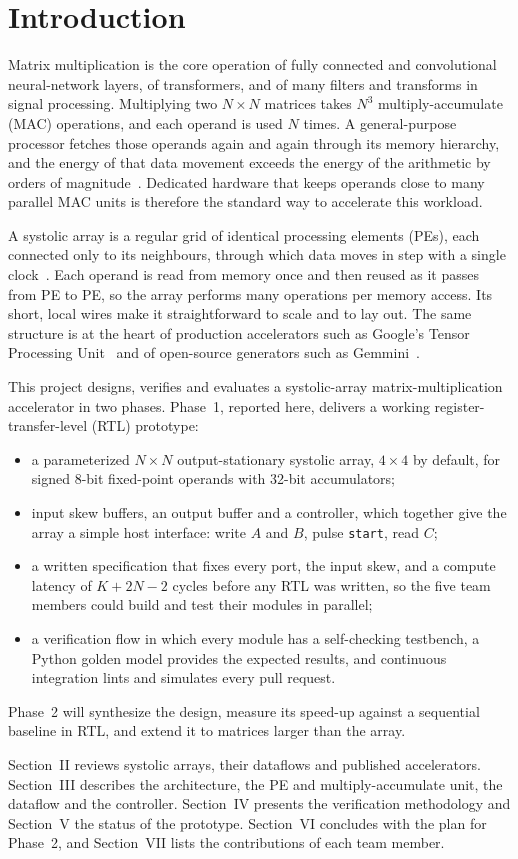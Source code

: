 
\section{Introduction}
Matrix multiplication is the core operation of fully connected and convolutional neural-network layers, of transformers, and of many filters and transforms in signal processing. Multiplying two $N \times N$ matrices takes $N^3$ multiply-accumulate (MAC) operations, and each operand is used $N$ times. A general-purpose processor fetches those operands again and again through its memory hierarchy, and the energy of that data movement exceeds the energy of the arithmetic by orders of magnitude~\cite{horowitz2014energy, sze2017efficient}. Dedicated hardware that keeps operands close to many parallel MAC units is therefore the standard way to accelerate this workload.

A systolic array is a regular grid of identical processing elements (PEs), each connected only to its neighbours, through which data moves in step with a single clock~\cite{kung1979systolic, kung1982systolic}. Each operand is read from memory once and then reused as it passes from PE to PE, so the array performs many operations per memory access. Its short, local wires make it straightforward to scale and to lay out. The same structure is at the heart of production accelerators such as Google's Tensor Processing Unit~\cite{jouppi2017tpu} and of open-source generators such as Gemmini~\cite{genc2021gemmini}.

This project designs, verifies and evaluates a systolic-array matrix-multiplication accelerator in two phases. Phase~1, reported here, delivers a working register-transfer-level (RTL) prototype:
\begin{itemize}
\item a parameterized $N \times N$ output-stationary systolic array, $4 \times 4$ by default, for signed 8-bit fixed-point operands with 32-bit accumulators;
\item input skew buffers, an output buffer and a controller, which together give the array a simple host interface: write $A$ and $B$, pulse \texttt{start}, read $C$;
\item a written specification that fixes every port, the input skew, and a compute latency of $K + 2N - 2$ cycles before any RTL was written, so the five team members could build and test their modules in parallel;
\item a verification flow in which every module has a self-checking testbench, a Python golden model provides the expected results, and continuous integration lints and simulates every pull request.
\end{itemize}
Phase~2 will synthesize the design, measure its speed-up against a sequential baseline in RTL, and extend it to matrices larger than the array.

Section~II reviews systolic arrays, their dataflows and published accelerators. Section~III describes the architecture, the PE and multiply-accumulate unit, the dataflow and the controller. Section~IV presents the verification methodology and Section~V the status of the prototype. Section~VI concludes with the plan for Phase~2, and Section~VII lists the contributions of each team member.
